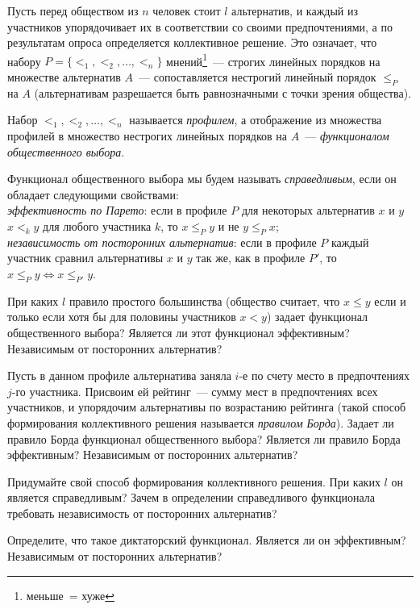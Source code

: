 \documentclass[a4paper,12pt]{article}
\begin{document}


Пусть перед обществом из $n$ человек стоит $l$ альтернатив, и каждый
из участников упорядочивает их в соответствии со своими
предпочтениями, а по результатам опроса определяется коллективное
решение. Это означает, что набору $P = \{<_1, <_2, \ldots, <_n\}$
мнений\footnote{ меньше\ =  хуже}~--- строгих линейных
порядков на множестве альтернатив $A$~--- сопоставляется нестрогий
линейный порядок $\leq_P$ на $A$ (альтернативам разрешается быть
равнозначными с точки зрения общества).

 Набор $<_1, <_2, \ldots, <_n$ называется {\em профилем}, а
отображение из множества профилей в множество нестрогих линейных
порядков на $A$~--- {\em функционалом общественного выбора}. 

 Функционал общественного выбора мы будем называть {\em
справедливым}, если он обладает следующими свойствами:
\\
{\em эффективность по Парето}: если в профиле $P$ для некоторых
альтернатив $x$ и $y$ $x<_k y$ для любого участника $k$, то $x\leq_P
y$ и не $y\leq_P x$;
\\
{\em независимость от посторонних альтернатив}: если в профиле $P$
каждый участник сравнил альтернативы $x$ и $y$ так же, как в профиле
$P'$, то $x\leq_P y \Longleftrightarrow x\leq_{P'} y$. 


  При каких $l$ правило простого большинства (общество
считает, что $x\leq y$ если и только если хотя бы для половины
участников $x < y$) задает функционал общественного выбора? 
Является ли этот функционал эффективным? Независимым от посторонних
альтернатив? 

 Пусть в данном профиле альтернатива заняла $i$-е по счету
место в предпочтениях $j$-го участника. Присвоим ей рейтинг~---
сумму мест в предпочтениях всех участников, и упорядочим
альтернативы по возрастанию рейтинга (такой способ формирования
коллективного решения называется {\em правилом Борда}).
  Задает ли правило Борда функционал
общественного выбора?  Является ли правило Борда эффективным?
Независимым от посторонних альтернатив? 

  Придумайте свой способ формирования коллективного
решения. При каких $l$ он является справедливым?  Зачем в
определении справедливого функционала требовать независимость от
посторонних альтернатив? 

 Определите, что такое диктаторский функционал. Является ли
он эффективным? Независимым от посторонних альтернатив? 
\end{document}
